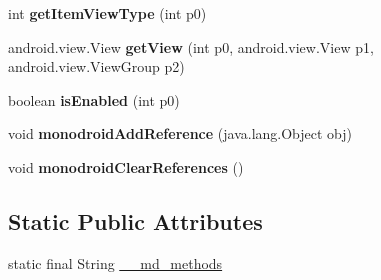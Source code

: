 \begin{DoxyCompactItemize}
int {\bfseries get\+Item\+View\+Type} (int p0)
\item 
\mbox{\label{classmd5b60ffeb829f638581ab2bb9b1a7f4f3f_1_1ListViewAdapter_ae2fe00b727ac49a6127f035217453806}} 
android.\+view.\+View {\bfseries get\+View} (int p0, android.\+view.\+View p1, android.\+view.\+View\+Group p2)
\item 
\mbox{\label{classmd5b60ffeb829f638581ab2bb9b1a7f4f3f_1_1ListViewAdapter_a15dc86c11acd1d564985b671571b2d78}} 
boolean {\bfseries is\+Enabled} (int p0)
\item 
\mbox{\label{classmd5b60ffeb829f638581ab2bb9b1a7f4f3f_1_1ListViewAdapter_a1325a463fbf8e693412780668a9e9a7e}} 
void {\bfseries monodroid\+Add\+Reference} (java.\+lang.\+Object obj)
\item 
\mbox{\label{classmd5b60ffeb829f638581ab2bb9b1a7f4f3f_1_1ListViewAdapter_a92941f5776f2c562a319f8c0cce9f2a4}} 
void {\bfseries monodroid\+Clear\+References} ()
\end{DoxyCompactItemize}
\subsection*{Static Public Attributes}
\begin{DoxyCompactItemize}
\item 
static final String \hyperlink{classmd5b60ffeb829f638581ab2bb9b1a7f4f3f_1_1ListViewAdapter_a3484b09d18c193e3a6efbf9abd22592a}{\+\_\+\+\_\+md\+\_\+methods}
\end{DoxyCompactItemize}

